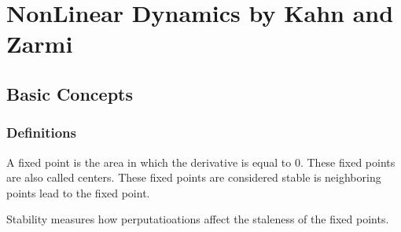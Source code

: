 \chapter{NonLinear Dynamics by Kahn and Zarmi}

\section{Basic Concepts}
\subsection{Definitions}

A fixed point is the area in which the derivative is equal to 0. These fixed points are also called centers. These fixed points are considered stable is neighboring points lead to the fixed point.

Stability measures how perputatioations affect the staleness of the fixed points.
